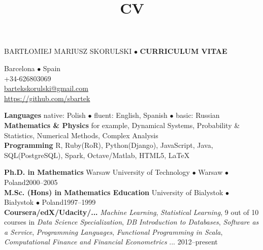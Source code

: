 \documentclass[a4paper, twoside]{scrreprt}
\title{CV}
\author{}
\date{}
\begin{document}
\noindent BARTŁOMIEJ MARIUSZ SKORULSKI $\bullet$ \textbf{CURRICULUM VITAE}
\vspace{-0.3cm}

\noindent\makebox[\linewidth]{\rule{\textwidth}{0.4pt}}

{\small
\noindent\llap{\FA \faHome\ \ } Barcelona $\bullet$ Spain\\
\noindent\llap{\FA \faMobilePhone\ \ \ }+34-626803069\\
\noindent\llap{\FA \faEnvelope\ \ }\href{mailto:bartekskorulski@gmail.com}{bartekskorulski@gmail.com}\\
\noindent\llap{\FA \faGithub\ \ }
\href{https://github.com/sbartek}{https://github.com/sbartek}\\
}
\noindent\makebox[\linewidth]{\rule{\textwidth}{0.4pt}}

\vspace{0.1cm}


\noindent\llap{\FA \faComments\ \ }\textbf{Languages} native: Polish $\bullet$ fluent: English, Spanish $\bullet$ basic: Russian \\
\noindent\llap{\FA \faSuperscript\ \ }\textbf{Mathematics \& Physics} for example, Dynamical Systems, Probability \& Statistics, Numerical Methods, 
Complex Analysis\\
\noindent\llap{\FA \faKeyboard\ \ }\textbf{Programming} R, Ruby(RoR), Python(Django),  JavaScript, Java, SQL(PostgreSQL), Spark, Octave/Matlab, HTML5, 
\LaTeX \\
\noindent\makebox[\linewidth]{\rule{\textwidth}{0.4pt}}

\vspace{0.1cm}
\noindent\textbf{Ph.D. in Mathematics} Warsaw University of Technology $\bullet$ Warsaw $\bullet$ Poland\hfill 2000--2005\\
\noindent\textbf{M.Sc. (Hons) in Mathematics Education} University of Bialystok $\bullet$ Białystok $\bullet$ Poland\hfill 1997--1999\\
\noindent\textbf{Coursera/edX/Udacity/...} \emph{Machine Learning}, 
\emph{Statistical Learning}, 9 out of 10 courses in \emph{Data Science Specialization}, 
\emph{DB Introduction to Databases}, \emph{Software as a Service}, 
\emph{Programming Languages}, \emph{Functional Programming in Scala}, 
\emph{Computational Finance and Financial Econometrics} ... \hfill 2012--present\\
\noindent\makebox[\linewidth]{\rule{\textwidth}{0.4pt}}
\end{document}
